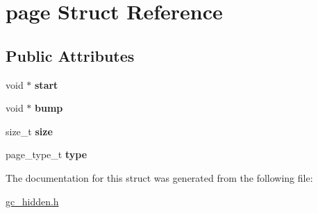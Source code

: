 \hypertarget{structpage}{\section{page Struct Reference}
\label{structpage}
}
\subsection*{Public Attributes}
\begin{DoxyCompactItemize}
\item 
\hypertarget{structpage_a2b3f55e00ff29b84992b5b47f72fb72d}{void $\ast$ {\bfseries start}}\label{structpage_a2b3f55e00ff29b84992b5b47f72fb72d}

\item 
\hypertarget{structpage_a6ad4c9be69d661d94b74fbb7b41f7d3d}{void $\ast$ {\bfseries bump}}\label{structpage_a6ad4c9be69d661d94b74fbb7b41f7d3d}

\item 
\hypertarget{structpage_a077b5c879b7825ab21dad61d96ea9b65}{size\-\_\-t {\bfseries size}}\label{structpage_a077b5c879b7825ab21dad61d96ea9b65}

\item 
\hypertarget{structpage_ab70c0798f1e3ad36842dd8a1454d2b21}{page\-\_\-type\-\_\-t {\bfseries type}}\label{structpage_ab70c0798f1e3ad36842dd8a1454d2b21}

\end{DoxyCompactItemize}


The documentation for this struct was generated from the following file\-:\begin{DoxyCompactItemize}
\item 
\hyperlink{gc__hidden_8h}{gc\-\_\-hidden.\-h}\end{DoxyCompactItemize}
